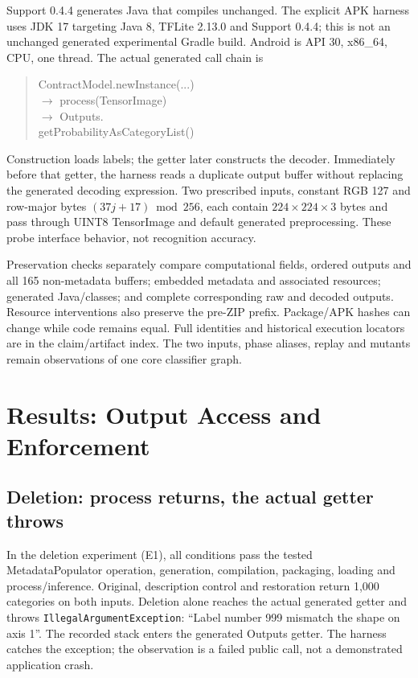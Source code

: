 \documentclass[10pt,conference]{IEEEtran}
\newcommand{\code}[1]{\texttt{#1}}
\begin{document}
Support 0.4.4 generates Java that compiles unchanged. The explicit APK harness uses JDK 17 targeting Java 8, TFLite 2.13.0 and Support 0.4.4; this is not an unchanged generated experimental Gradle build. Android is API 30, x86\_64, CPU, one thread. The actual generated call chain is
\begin{quote}\small\ttfamily\raggedright
ContractModel.newInstance(...)\\
\(\rightarrow\) process(TensorImage)\\
\(\rightarrow\) Outputs.\\
\hspace*{1em}getProbabilityAsCategoryList()
\end{quote}
Construction loads labels; the getter later constructs the decoder. Immediately before that getter, the harness reads a duplicate output buffer without replacing the generated decoding expression. Two prescribed inputs, constant RGB 127 and row-major bytes $(37j+17)\bmod256$, each contain $224\times224\times3$ bytes and pass through UINT8 TensorImage and default generated preprocessing. These probe interface behavior, not recognition accuracy.

Preservation checks separately compare computational fields, ordered outputs and all 165 non-metadata buffers; embedded metadata and associated resources; generated Java/classes; and complete corresponding raw and decoded outputs. Resource interventions also preserve the pre-ZIP prefix. Package/APK hashes can change while code remains equal. Full identities and historical execution locators are in the claim/artifact index. The two inputs, phase aliases, replay and mutants remain observations of one core classifier graph.

\section{Results: Output Access and Enforcement}
\label{sec:results}
\subsection{Deletion: process returns, the actual getter throws}
\label{sec:e1}
In the deletion experiment (E1), all conditions pass the tested MetadataPopulator operation, generation, compilation, packaging, loading and process/inference. Original, description control and restoration return 1,000 categories on both inputs. Deletion alone reaches the actual generated getter and throws \code{IllegalArgumentException}: ``Label number 999 mismatch the shape on axis 1''. The recorded stack enters the generated Outputs getter. The harness catches the exception; the observation is a failed public call, not a demonstrated application crash.
\end{document}
